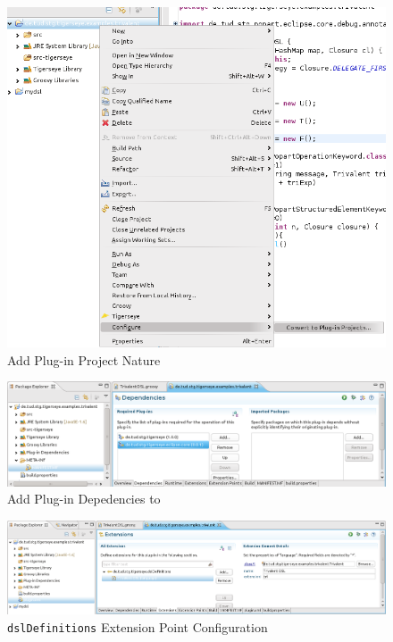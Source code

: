   	\begin{figure}
	  \centering
	  \includegraphics[width=.5\textwidth,keepaspectratio=true]{../pics/example_deploy_converttoplugin.png}
	  \caption{Add Plug-in Project Nature}\label{fig:example_deploy_converttoplugin}
	\end{figure}
	 
	\begin{figure}
	  \centering
	  \includegraphics[width=\textwidth,keepaspectratio=true]{../pics/example_deploy_addplugindependencies.png}
	  \caption{Add Plug-in Depedencies to \tiger}\label{fig:example_deploy_addplugindependencies}
	\end{figure}
	
		\begin{figure}
	  \centering
	  \includegraphics[width=\textwidth,keepaspectratio=true]{../pics/example_deploy_extensionpoint.png}
	  \caption{\texttt{dslDefinitions} Extension Point Configuration}\label{fig:example_deploy_extensionpoint}
	\end{figure} 
